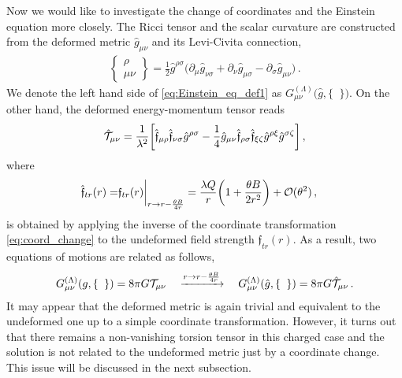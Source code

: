 \documentclass[11pt]{article}
\numberwithin{equation}{section}
\begin{document}
Now we would like to investigate the change of coordinates and the Einstein equation more closely.
The Ricci tensor and the scalar curvature are constructed from the deformed metric
$\hat{g}_{\mu\nu}$ and its Levi-Civita connection, 
\begin{align}
                          \begin{Bmatrix}
                            \rho \\ \mu\nu
                          \end{Bmatrix}
=\frac{1}{2}\hat{g}^{\rho\sigma} \big( \partial_\mu \hat{g}_{\nu\sigma} +\partial_\nu \hat{g}_{\mu\sigma}
-\partial_\sigma \hat{g}_{\mu\nu} \big) \,.
\end{align}
We denote the left hand side of \eqref{eq:Einstein_eq_def1}
as $G_{\mu\nu}^{(\Lambda)}\big( \hat{g},\{ \phantom{a} \} \big)$.
On the other hand, the deformed energy-momentum tensor reads
\begin{align}
  \hat{\cal T}_{\mu\nu}= \frac{1}{\lambda^2} \bigg[ \hat{\mathfrak{f}}_{\mu\rho} \hat{\mathfrak{f}}_{\nu\sigma} \hat{g}^{\rho\sigma}
-\frac{1}{4}\hat{g}_{\mu\nu} \hat{\mathfrak{f}}_{\rho\sigma} \hat{\mathfrak{f}}_{\xi\zeta} \hat{g}^{\rho\xi} \hat{g}^{\sigma\zeta} \bigg] \,,
\label{eq:EM_tensor_def}
\end{align}
where
\begin{align}
  \hat{\mathfrak{f}}_{tr}(r)=&
\mathfrak{f}_{tr}(r) \bigg|_{r \rightarrow r-\frac{\theta B}{4r}}=
\frac{\lambda Q}{r} \bigg(1+\frac{\theta B}{2r^2} \bigg) + {\cal O}(\theta^2) \,,
\label{eq:f_sol_def}
\end{align}
is obtained by applying the inverse of the coordinate transformation \eqref{eq:coord_change}
to the undeformed field strength $\mathfrak{f}_{tr}(r)$.
As a result, two equations of motions are related as follows,
\begin{align}
  G_{\mu\nu}^{(\Lambda)}(g,\{ \phantom{a}\}) = 8\pi G {\cal T}_{\mu\nu}
\quad
\xrightarrow{r\rightarrow r-\frac{\theta B}{4r}}
\quad
G_{\mu\nu}^{(\Lambda)}(\hat{g},\{ \phantom{a}\}) = 8\pi G \hat{\cal T}_{\mu\nu} \,.
\end{align}
It may appear that the deformed metric is again trivial and equivalent to the undeformed one up to a simple coordinate transformation.
However, it turns out that there remains a non-vanishing torsion tensor
in this charged case and the solution
is not related to the undeformed metric just by a coordinate change.
This issue will be discussed in the next subsection.
\end{document}
